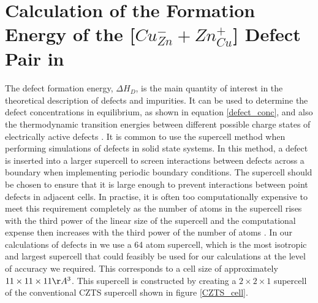 \chapter{Calculation of the Formation Energy of the [$Cu_{Zn}^- + Zn_{Cu}^+$] Defect Pair in {\CZTS}}\label{Cu-Zn_defects_calc}
The defect formation energy, $\Delta H_D$, is the main quantity of interest in the theoretical description of defects and impurities. It can be used to determine the defect concentrations in equilibrium, as shown in equation \ref{defect_conc}, and also the thermodynamic transition energies between different possible charge states of electrically active defects \cite{defects_Lany}. 
It is common to use the supercell method when performing simulations of defects in solid state systems. 
In this method, a defect is inserted into a larger supercell to screen interactions between defects across a boundary when implementing periodic boundary conditions. The supercell should be chosen to ensure that it is large enough to prevent interactions between point defects in adjacent cells. In practise, it is often too computationally expensive to meet this requirement completely as the number of atoms in the supercell rises with the third power of the linear size of the supercell and the computational expense then increases with the third power of the number of atoms \cite{supercell_method}. In our calculations of defects in {\CZTS} we use a 64 atom supercell, which is the most isotropic and largest supercell that could feasibly be used for our calculations at the level of accuracy we required. This corresponds to a cell size of approximately $11\times11\times11 \AA^3$. This supercell is constructed by creating a $2\times2\times1$ supercell of the conventional CZTS supercell shown in figure \ref{CZTS_cell}.

